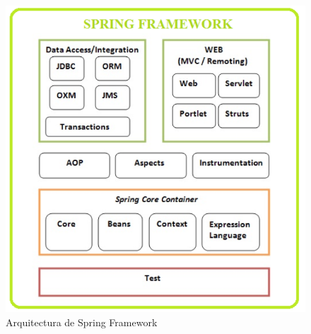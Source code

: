 			\begin{figure}[H]
			    \centering
				\includegraphics[width=14cm]{../imgs/ejemplos/spring-comp.png}
				\caption{Arquitectura de Spring Framework}
				\label{figure:spring-comp}
			\end{figure}
			
			
			
